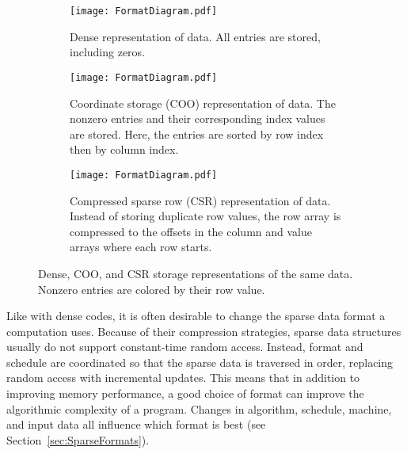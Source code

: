 \begin{figure*}
  \centering
  \begin{subfigure}{0.45\textwidth}
    \texttt{[image: FormatDiagram.pdf]}
    \caption{Dense representation of data. All entries are stored, including zeros.}\label{FormatDiagram:Dense}
  \end{subfigure}
  \begin{subfigure}{0.45\textwidth}
    \texttt{[image: FormatDiagram.pdf]}
    \caption{Coordinate storage (COO) representation of data. The nonzero entries and their corresponding index values are stored. Here, the entries are sorted by row index then by column index.}\label{FormatDiagram:COO}
  \end{subfigure}

  \begin{subfigure}[c]{0.45\textwidth}
    \texttt{[image: FormatDiagram.pdf]}
    \caption{Compressed sparse row (CSR) representation of data. Instead of storing duplicate row values, the row array is compressed to the offsets in the column and value arrays where each row starts.}\label{FormatDiagram:CSR}
  \end{subfigure}
\caption{Dense, COO, and CSR storage representations of the same data.  Nonzero entries are colored by their row value.}\label{FormatDiagram}
\end{figure*}

Like with dense codes, it is often desirable to change the sparse data format a computation uses.
Because of their compression strategies, sparse data structures usually do not support constant-time random access.
Instead, format and schedule are coordinated so that the sparse data is traversed in order, replacing random access with incremental updates.
This means that in addition to improving memory performance, a good choice of format can improve the algorithmic complexity of a program.
Changes in algorithm, schedule, machine, and input data all influence which format is best (see Section~\ref{sec:SparseFormats}).


